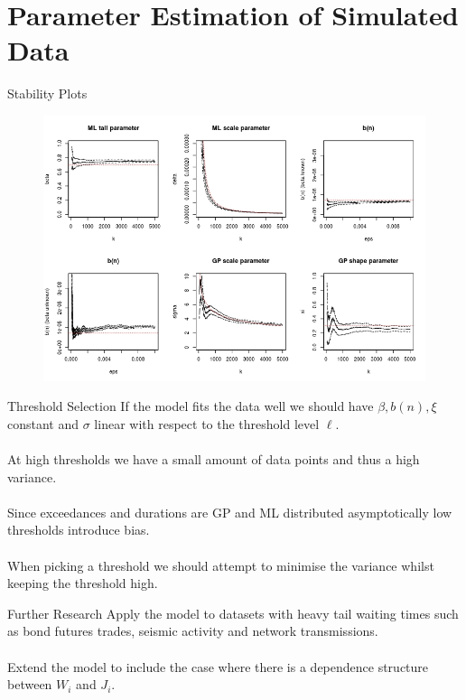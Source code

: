 \documentclass{beamer}
\begin{document}
\section{Parameter Estimation of Simulated Data}

\begin{frame}{Stability Plots}
    \begin{figure}
        \centering
        \vspace{-0.5cm}
        \hspace{-0cm}
        \includegraphics[scale=0.45]{ParameterThresholdPlots.jpeg}
    \end{figure}
\end{frame}

\begin{frame}{Threshold Selection}
If the model fits the data well we should have $\beta, b(n), \xi$ constant and $\sigma$ linear with respect to the threshold level $\ell$.
\\~\\
At high thresholds we have a small amount of data points and thus a high variance.
\\~\\
Since exceedances and durations are GP and ML distributed asymptotically low thresholds introduce bias.
\\~\\
When picking a threshold we should attempt to minimise the variance whilst keeping the threshold high.
\end{frame}

\begin{frame}{Further Research}
Apply the model to datasets with heavy tail waiting times such as bond futures trades, seismic activity and network transmissions.
\\~\\
Extend the model to include the case where there is a dependence structure between $W_i$ and $J_i$.
\end{frame}
 
\end{document}
